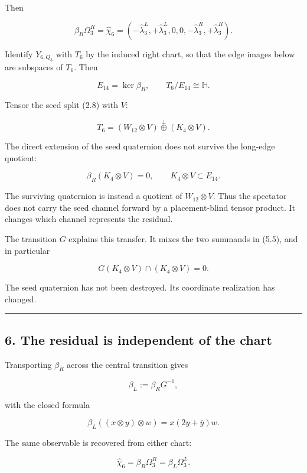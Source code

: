\documentclass[
  11pt,
  a4paper,
]{article}
\begin{document}
Then

\[
\boxed{
\beta_R\Omega_3^R
=
\widehat\chi_6
=
(-\widehat\lambda_3^L,+\widehat\lambda_3^L,0,0,
-\widehat\lambda_3^R,+\widehat\lambda_3^R).
}
\tag{5.3}
\]

Identify \(Y_{6,Q_3}\) with \(T_6\) by the induced right chart, so that
the edge images below are subspaces of \(T_6\). Then

\[
\boxed{
E_{14}=\ker\beta_R,
\qquad
T_6/E_{14}\cong\mathbb H.
}
\tag{5.4}
\]

Tensor the seed split (2.8) with \(V\):

\[
T_6
=
(W_{12}\otimes V)
\mathbin{\overset\perp\oplus}
(K_4\otimes V).
\tag{5.5}
\]

The direct extension of the seed quaternion does not survive the
long-edge quotient:

\[
\boxed{
\beta_R(K_4\otimes V)=0,
\qquad
K_4\otimes V\subset E_{14}.
}
\tag{5.6}
\]

The surviving quaternion is instead a quotient of \(W_{12}\otimes V\).
Thus the spectator does not carry the seed channel forward by a
placement-blind tensor product. It changes which channel represents the
residual.

The transition \(G\) explains this transfer. It mixes the two summands
in (5.5), and in particular

\[
G(K_4\otimes V)\cap(K_4\otimes V)=0.
\tag{5.7}
\]

The seed quaternion has not been destroyed. Its coordinate realization
has changed.

\begin{center}\rule{0.5\linewidth}{0.5pt}\end{center}

\hypertarget{the-residual-is-independent-of-the-chart}{%
\subsection{6. The residual is independent of the
chart}\label{the-residual-is-independent-of-the-chart}}

Transporting \(\beta_R\) across the central transition gives

\[
\beta_L:=\beta_RG^{-1},
\tag{6.1}
\]

with the closed formula

\[
\beta_L((x\otimes y)\otimes w)=x(2y+\bar y)w.
\tag{6.2}
\]

The same observable is recovered from either chart:

\[
\boxed{
\widehat\chi_6
=
\beta_R\Omega_3^R
=
\beta_L\Omega_3^L.
}
\tag{6.3}
\]
\end{document}
